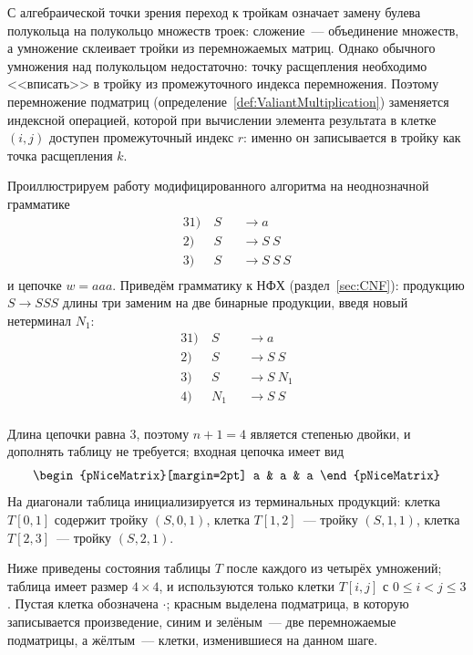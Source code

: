 С алгебраической точки зрения переход к тройкам означает замену булева полукольца на полукольцо множеств троек: сложение~--- объединение множеств, а умножение склеивает тройки из перемножаемых матриц.
Однако обычного умножения над полукольцом недостаточно: точку расщепления необходимо <<вписать>> в тройку из промежуточного индекса перемножения.
Поэтому перемножение подматриц (определение~\ref{def:ValiantMultiplication}) заменяется индексной операцией, которой при вычислении элемента результата в клетке $(i,j)$ доступен промежуточный индекс $r$: именно он записывается в тройку как точка расщепления $k$.

\begin{example}
  \label{exmpl:Valiant_SPPF}
  Проиллюстрируем работу модифицированного алгоритма на неоднозначной грамматике
  \begin{alignat*}{3}
  1) \ & S &&\rightarrow a \\
  2) \ & S &&\rightarrow S\ S \\
  3) \ & S &&\rightarrow S\ S\ S \\
  \end{alignat*}
  и цепочке $w = a a a$.
  Приведём грамматику к НФХ (раздел~\ref{sec:CNF}): продукцию $S \to S S S$ длины три заменим на две бинарные продукции, введя новый нетерминал $N_1$:
  \begin{alignat*}{3}
  1) \ & S &&\rightarrow a \\
  2) \ & S &&\rightarrow S\ S \\
  3) \ & S &&\rightarrow S\ N_1 \\
  4) \ & N_1 &&\rightarrow S\ S \\
  \end{alignat*}

  Длина цепочки равна $3$, поэтому $n + 1 = 4$ является степенью двойки, и дополнять таблицу не требуется; входная цепочка имеет вид
  \[
  \begin{pNiceMatrix}[margin=2pt] a & a & a \end{pNiceMatrix}
  \]
  На диагонали таблица инициализируется из терминальных продукций: клетка $T[0,1]$ содержит тройку $(S, 0, 1)$, клетка $T[1,2]$~--- тройку $(S, 1, 1)$, клетка $T[2,3]$~--- тройку $(S, 2, 1)$.

  Ниже приведены состояния таблицы $T$ после каждого из четырёх умножений; таблица имеет размер $4 \times 4$, и используются только клетки $T[i,j]$ с $0 \leqslant i < j \leqslant 3$.
  Пустая клетка обозначена $\cdot$; красным выделена подматрица, в которую записывается произведение, синим и зелёным~--- две перемножаемые подматрицы, а жёлтым~--- клетки, изменившиеся на данном шаге.


\end{example}
